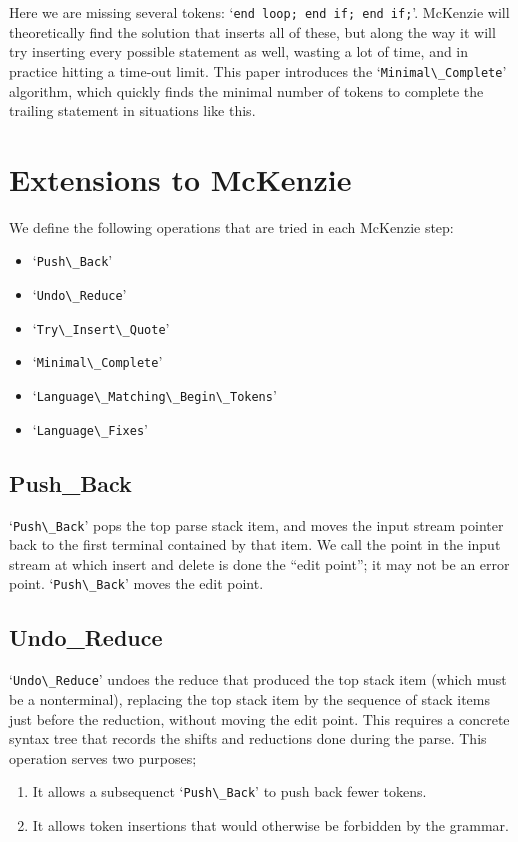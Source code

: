 \documentclass[authordraft]{acmart}
\newcommand{\code}[1]{`\lstinline|#1|'}
\begin{document}
Here we are missing several tokens: \code{end loop; end if; end if;}.
McKenzie will theoretically find the solution that inserts all of
these, but along the way it will try inserting every possible
statement as well, wasting a lot of time, and in practice hitting a
time-out limit. This paper introduces the \code{Minimal\_Complete}
algorithm, which quickly finds the minimal number of tokens
to complete the trailing statement in situations like this.

\section{Extensions to McKenzie}
\label{sect:extensions}
We define the following operations that are tried in each McKenzie
step:
\begin{itemize}
\item \code{Push\_Back}
\item \code{Undo\_Reduce}
\item \code{Try\_Insert\_Quote}
\item \code{Minimal\_Complete}
\item \code{Language\_Matching\_Begin\_Tokens}
\item \code{Language\_Fixes}
\end{itemize}

\subsection{Push\_Back}
\code{Push\_Back} pops the top parse stack item, and moves the input
stream pointer back to the first terminal contained by that item. We
call the point in the input stream at which insert and delete is done
the ``edit point''; it may not be an error point. \code{Push\_Back}
moves the edit point.

\subsection{Undo\_Reduce}
\code{Undo\_Reduce} undoes the reduce that produced the top stack item
(which must be a nonterminal), replacing the top stack item by the
sequence of stack items just before the reduction, without moving the
edit point. This requires a concrete syntax tree that records the
shifts and reductions done during the parse. This operation serves two
purposes;
\begin{enumerate}
\item It allows a subsequenct \code{Push\_Back} to push back fewer tokens.

\item It allows token insertions that would otherwise be forbidden by the
grammar.
\end{enumerate}
\end{document}
